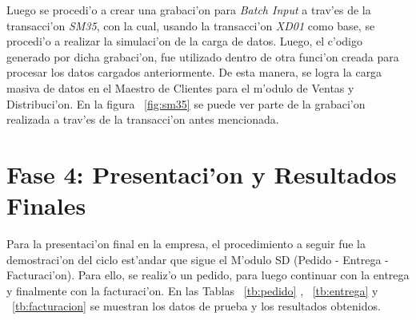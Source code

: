 \indent Luego se procedi'o a crear una grabaci'on para \textit{Batch Input} a trav'es de la transacci'on \textit{SM35}, con la cual, usando la transacci'on \textit{XD01} como base, se procedi'o a realizar la simulaci'on de la carga de datos. Luego, el c'odigo generado por dicha grabaci'on, fue utilizado dentro de otra funci'on creada para procesar los datos cargados anteriormente. De esta manera, se logra la carga masiva de datos en el Maestro de Clientes para el m'odulo de Ventas y Distribuci'on. En la figura ~\ref{fig:sm35} se puede ver parte de la grabaci'on realizada a trav'es de la transacci'on antes mencionada.


\section{Fase 4: Presentaci'on y Resultados Finales}
	Para la presentaci'on final en la empresa, el procedimiento a seguir fue la demostraci'on del ciclo est'andar que sigue el M'odulo SD (Pedido - Entrega - Facturaci'on). Para ello, se realiz'o un pedido, para luego continuar con la entrega y finalmente con la facturaci'on. En las Tablas ~\ref{tb:pedido} , ~\ref{tb:entrega} y ~\ref{tb:facturacion} se muestran los datos de prueba y los resultados obtenidos. 
	
